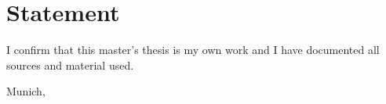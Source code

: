 \chapter{Statement}
I confirm that this master's thesis is my own work and I have documented all sources and material used.

\vspace{4\baselineskip}

\makeatletter
Munich, \@date
\makeatother
